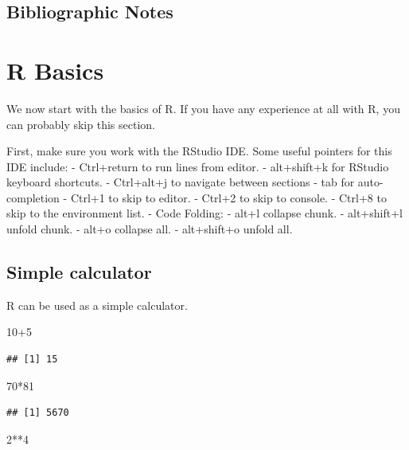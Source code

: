 \documentclass[]{book}
\newenvironment{Shaded}{\begin{snugshade}}{\end{snugshade}}
\newcommand{\DecValTok}[1]{\textcolor[rgb]{0.00,0.00,0.81}{{#1}}}
\newcommand{\NormalTok}[1]{{#1}}
\theoremstyle{definition}
\theoremstyle{definition}
\theoremstyle{remark}
\begin{document}
\section{Bibliographic Notes}\label{bibliographic-notes}

\chapter{R Basics}\label{basics}

We now start with the basics of R. If you have any experience at all
with R, you can probably skip this section.

First, make sure you work with the RStudio IDE. Some useful pointers for
this IDE include: - Ctrl+return to run lines from editor. - alt+shift+k
for RStudio keyboard shortcuts. - Ctrl+alt+j to navigate between
sections - tab for auto-completion - Ctrl+1 to skip to editor. - Ctrl+2
to skip to console. - Ctrl+8 to skip to the environment list. - Code
Folding: - alt+l collapse chunk. - alt+shift+l unfold chunk. - alt+o
collapse all. - alt+shift+o unfold all.

\section{Simple calculator}\label{simple-calculator}

R can be used as a simple calculator.

\begin{Shaded}
\begin{Highlighting}[]
\DecValTok{10+5}
\end{Highlighting}
\end{Shaded}

\begin{verbatim}
## [1] 15
\end{verbatim}

\begin{Shaded}
\begin{Highlighting}[]
\DecValTok{70}\NormalTok{*}\DecValTok{81}
\end{Highlighting}
\end{Shaded}

\begin{verbatim}
## [1] 5670
\end{verbatim}

\begin{Shaded}
\begin{Highlighting}[]
\DecValTok{2}\NormalTok{**}\DecValTok{4}
\end{Highlighting}
\end{Shaded}
\end{document}
